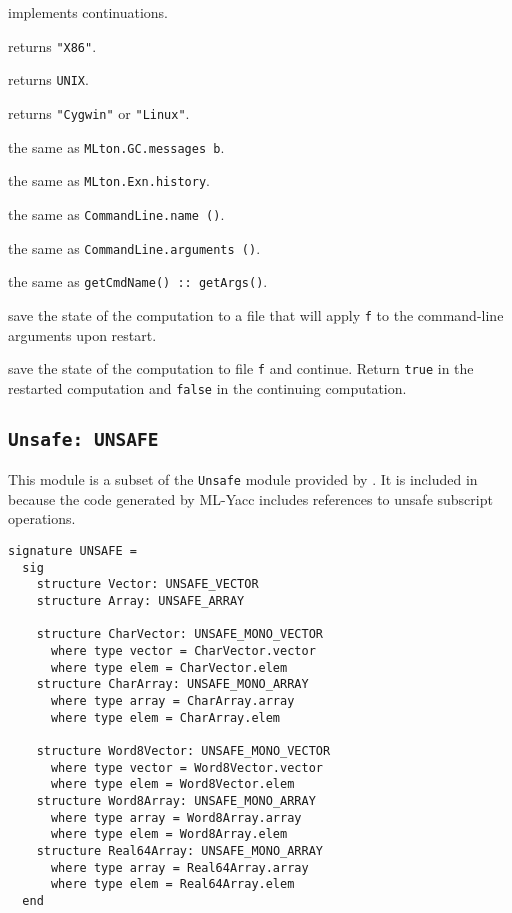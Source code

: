 \begin{description}

 implements continuations.

returns {\tt "X86"}.

returns {\tt UNIX}.

returns {\tt "Cygwin"} or {\tt "Linux"}.

the same as {\tt MLton.GC.messages b}.

the same as {\tt MLton.Exn.history}.

the same as {\tt CommandLine.name ()}.

the same as {\tt CommandLine.arguments ()}.

the same as {\tt getCmdName() :: getArgs()}.

save the state of the computation to a file that will apply {\tt f} to
the command-line arguments upon restart.

save the state of the computation to file {\tt f} and continue.
Return {\tt true} in the restarted computation and {\tt false} in the
continuing computation.

\end{description}

\subsection{{\tt Unsafe: UNSAFE}}

This module is a subset of the {\tt Unsafe} module provided by
{\smlnj}.  It is included in {\mlton} because the code generated by
ML-Yacc includes references to unsafe subscript operations.

\begin{verbatim}
signature UNSAFE =
  sig
    structure Vector: UNSAFE_VECTOR
    structure Array: UNSAFE_ARRAY

    structure CharVector: UNSAFE_MONO_VECTOR
      where type vector = CharVector.vector
      where type elem = CharVector.elem
    structure CharArray: UNSAFE_MONO_ARRAY
      where type array = CharArray.array
      where type elem = CharArray.elem

    structure Word8Vector: UNSAFE_MONO_VECTOR
      where type vector = Word8Vector.vector
      where type elem = Word8Vector.elem
    structure Word8Array: UNSAFE_MONO_ARRAY
      where type array = Word8Array.array
      where type elem = Word8Array.elem
    structure Real64Array: UNSAFE_MONO_ARRAY
      where type array = Real64Array.array
      where type elem = Real64Array.elem
  end
\end{verbatim}

